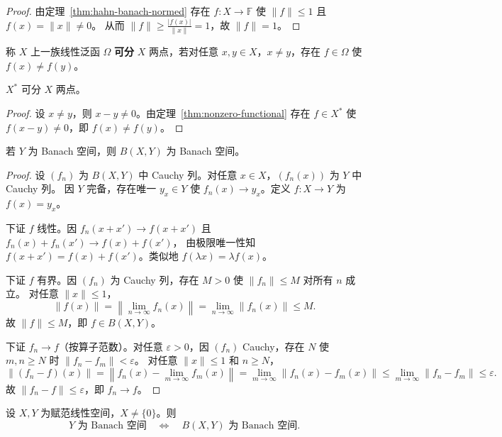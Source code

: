 \documentclass[lang=cn,a4paper,newtx,section]{elegantbook}
\begin{document}
\begin{proof}
  由定理~\ref{thm:hahn-banach-normed} 存在 $f:X\to\mathbb{F}$ 使 $\|f\|\le 1$ 且 $f(x)=\|x\|\ne 0$。
  从而 $\|f\|\ge\frac{|f(x)|}{\|x\|}=1$，故 $\|f\|=1$。
\end{proof}

\begin{definition}[可分点]
  称 $X$ 上一族线性泛函 $\Omega$ \textbf{可分} $X$ 两点，若对任意 $x,y\in X$，$x\ne y$，存在 $f\in\Omega$ 使 $f(x)\ne f(y)$。
\end{definition}

\begin{proposition}
  $X^*$ 可分 $X$ 两点。
\end{proposition}

\begin{proof}
  设 $x\ne y$，则 $x-y\ne 0$。由定理~\ref{thm:nonzero-functional} 存在 $f\in X^*$ 使 $f(x-y)\ne 0$，即 $f(x)\ne f(y)$。
\end{proof}

\begin{proposition}\label{prop:BXY-Banach}
  若 $Y$ 为 Banach 空间，则 $B(X,Y)$ 为 Banach 空间。
\end{proposition}

\begin{proof}
  设 $(f_n)$ 为 $B(X,Y)$ 中 Cauchy 列。对任意 $x\in X$，$(f_n(x))$ 为 $Y$ 中 Cauchy 列。
  因 $Y$ 完备，存在唯一 $y_x\in Y$ 使 $f_n(x)\to y_x$。定义 $f:X\to Y$ 为 $f(x)=y_x$。

  下证 $f$ 线性。因 $f_n(x+x')\to f(x+x')$ 且 $f_n(x)+f_n(x')\to f(x)+f(x')$，
  由极限唯一性知 $f(x+x')=f(x)+f(x')$。类似地 $f(\lambda x)=\lambda f(x)$。

  下证 $f$ 有界。因 $(f_n)$ 为 Cauchy 列，存在 $M>0$ 使 $\|f_n\|\le M$ 对所有 $n$ 成立。
  对任意 $\|x\|\le 1$，
  \[
    \|f(x)\|=\left\|\lim_{n\to\infty}f_n(x)\right\|=\lim_{n\to\infty}\|f_n(x)\|\le M.
  \]
  故 $\|f\|\le M$，即 $f\in B(X,Y)$。

  下证 $f_n\to f$（按算子范数）。对任意 $\varepsilon>0$，因 $(f_n)$ Cauchy，存在 $N$ 使 $m,n\ge N$ 时 $\|f_n-f_m\|<\varepsilon$。
  对任意 $\|x\|\le 1$ 和 $n\ge N$，
  \[
    \|(f_n-f)(x)\|=\left\|f_n(x)-\lim_{m\to\infty}f_m(x)\right\|=\lim_{m\to\infty}\|f_n(x)-f_m(x)\|\le\lim_{m\to\infty}\|f_n-f_m\|\le\varepsilon.
  \]
  故 $\|f_n-f\|\le\varepsilon$，即 $f_n\to f$。
\end{proof}

\begin{theorem}
  设 $X,Y$ 为赋范线性空间，$X\ne\{0\}$。则
  \[
    Y\text{ 为 Banach 空间}\quad\Longleftrightarrow\quad B(X,Y)\text{ 为 Banach 空间}.
  \]
\end{theorem}
\end{document}
